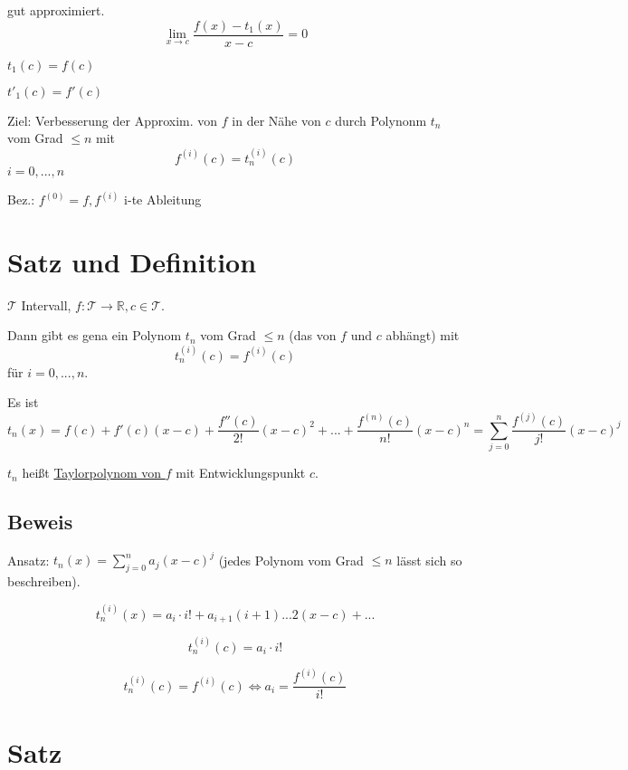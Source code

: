 \documentclass[a4paper, openany]{book}
\begin{document}
         gut approximiert. \[ \lim_{x \rightarrow c} \frac{f(x)-t_1(x)}{x-c} = 0 \]

         $t_1(c) = f(c)$

         $t'_1(c) = f'(c)$

         \par \medskip

         \par \medskip

         Ziel: Verbesserung der Approxim. von $f$ in der Nähe von $c$ durch Polynonm $t_n$ vom Grad $\le n$ mit \[f^{(i)} (c) = t^{(i)}_n(c)\] $i=0, ..., n$

         Bez.: $f^{(0)} = f, f^{(i)} $ i-te Ableitung

         \section{Satz und Definition}

         $\mathcal{T}$ Intervall, $f: \mathcal{T} \rightarrow \mathbb{R}, c \in \mathcal{T}$.

         Dann gibt es gena ein Polynom $t_n$ vom Grad $\le n$ (das von $f$ und $c$ abhängt) mit \[ t^{(i)}_n (c) = f^{(i)}(c) \] für $i=0,...,n$.

         \par \medskip

         Es ist \[t_n(x) = f(c) + f'(c)(x-c) + \frac{f''(c)}{2!} (x-c)^2+ ... + \frac{f^{(n)}(c)}{n!}(x-c)^n = \sum_{j=0}^n \frac{f^{(j)}(c)}{j!}(x-c)^j \]

         $t_n$ heißt \underline{Taylorpolynom von $f$} mit Entwicklungspunkt $c$.

         \subsection{Beweis}

         Ansatz: $t_n(x)= \sum\limits_{j=0}^n a_j(x-c)^j$ (jedes Polynom vom Grad $\le n$ lässt sich so beschreiben).

         \[ t_n^{(i)}(x) = a_i \cdot i! + a_{i+1} (i+1) ... 2(x-c) + ... \]

         \[ t_n^{(i)}(c) = a_i \cdot i! \]

         \[ t_n^{(i)} (c) = f^{(i)}(c) \Leftrightarrow a_i = \frac{f^{(i)}(c)}{i!} \]

         \section{Satz}
\end{document}
